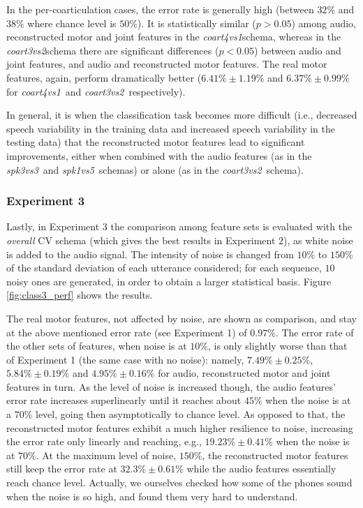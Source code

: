 \documentclass[10pt]{article}
\newcommand{\spkb}{\emph{spk3vs3}}
\newcommand{\spkc}{\emph{spk1vs5}}
\newcommand{\coa}{\emph{coart4vs1}}
\newcommand{\cob}{\emph{coart3vs2}}
\begin{document}
In the per-coarticulation cases, the error rate is generally high (between $32\%$ and $38\%$
where chance level is $50\%$). It is statistically similar ($p>0.05$) among audio, reconstructed
motor and joint features in the \coa schema, whereas in the \cob schema there are significant 
differences ($p<0.05$) between audio and joint features, and audio and reconstructed motor features.
The real motor features, again, perform dramatically better
($6.41\% \pm 1.19\%$ and $6.37\% \pm 0.99\%$ for \coa\ and \cob\ respectively).

In general, it is when the classification task becomes more difficult (i.e., decreased speech variability in the 
 training data and increased speech variability in the testing data) that the reconstructed motor features 
lead to significant improvements, either when combined with the audio features (as in the \spkb\ and \spkc\ 
schemas) or alone (as in the \cob\ schema).

\subsubsection*{Experiment 3}
\label{subsec:exp3}

Lastly, in Experiment 3 the comparison among feature sets is evaluated with the
\emph{overall} CV schema (which gives the best results in Experiment 2), as white noise is added
to the audio signal. The intensity of noise is changed from $10\%$ to $150\%$ of
the standard deviation of each utterance considered; for each sequence, $10$ noisy
ones are generated, in order to obtain a larger statistical basis.
Figure \ref{fig:class3_perf} shows the results.

The real motor features, not affected by noise, are shown as comparison, and stay at
the above mentioned error rate (see Experiment 1) of $0.97\%$. The error rate of the
other sets of features, when noise is at $10\%$, is only slightly worse than that of
Experiment 1 (the same case with no noise): namely,
$7.49\% \pm 0.25\%$, 
$5.84\% \pm 0.19\%$ and 
$4.95\% \pm 0.16\%$ for audio, reconstructed motor and joint features in turn.
As the level of noise is increased though, the audio features' error rate
increases superlinearly until it reaches about $45\%$ when the noise is at a $70\%$
level, going then asymptotically to chance level. As opposed to that, the reconstructed
motor features exhibit a much higher resilience to noise, increasing the error rate
only linearly and reaching, e.g., $19.23\% \pm 0.41\%$ when the noise is at $70\%$.
At the maximum level of noise, $150\%$, the reconstructed motor features still keep
the error rate at $32.3\% \pm 0.61\%$ while the audio features essentially reach chance
level. Actually, we ourselves checked how some of the phones sound when the noise is
so high, and found them very hard to understand.
\end{document}
